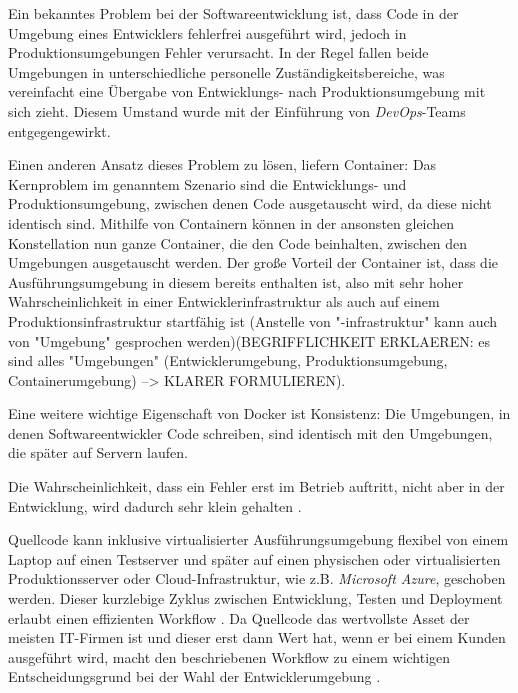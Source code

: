 \documentclass[../main.tex]{subfiles}
\begin{document}
    Ein bekanntes Problem bei der Softwareentwicklung ist, dass Code in der Umgebung eines Entwicklers fehlerfrei ausgeführt wird, jedoch in Produktionsumgebungen Fehler verursacht. In der Regel fallen beide Umgebungen in unterschiedliche personelle Zuständigkeitsbereiche, was vereinfacht eine Übergabe von Entwicklungs- nach Produktionsumgebung mit sich zieht. Diesem Umstand wurde mit der Einführung von \emph{\gls{DevOps}}-Teams entgegengewirkt.

    Einen anderen Ansatz dieses Problem zu lösen, liefern Container: Das Kernproblem im genanntem Szenario sind die Entwicklungs- und Produktionsumgebung, zwischen denen Code ausgetauscht wird, da diese nicht identisch sind. Mithilfe von Containern können in der ansonsten gleichen Konstellation nun ganze Container, die den Code beinhalten, zwischen den Umgebungen ausgetauscht werden. Der große Vorteil der Container ist, dass die Ausführungsumgebung in diesem bereits enthalten ist, also mit sehr hoher Wahrscheinlichkeit in einer Entwicklerinfrastruktur als auch auf einem Produktionsinfrastruktur startfähig ist (Anstelle von "-infrastruktur" kann auch von "Umgebung" gesprochen werden)(BEGRIFFLICHKEIT ERKLAEREN: es sind alles "Umgebungen" (Entwicklerumgebung, Produktionsumgebung, Containerumgebung) --> KLARER FORMULIEREN).

    Eine weitere wichtige Eigenschaft von Docker ist Konsistenz: Die Umgebungen, in denen Softwareentwickler Code schreiben, sind identisch mit den Umgebungen, die später auf Servern laufen.

    Die Wahrscheinlichkeit, dass ein Fehler erst im Betrieb auftritt, nicht aber in der Entwicklung, wird dadurch sehr klein gehalten \cite[S.8]{dockerBook}.

    Quellcode kann inklusive virtualisierter Ausführungsumgebung flexibel von einem Laptop auf einen Testserver und später auf einen physischen oder virtualisierten Produktionsserver oder \gls{Cloud}-Infrastruktur, wie z.B. \emph{Microsoft Azure}, geschoben werden. Dieser kurzlebige Zyklus zwischen Entwicklung, Testen und Deployment erlaubt einen effizienten Workflow \cite[S.8+12]{dockerBook}.
    Da Quellcode das wertvollste Asset der meisten \acrshort{IT}-Firmen ist und dieser erst dann Wert hat, wenn er bei einem Kunden ausgeführt wird, macht den beschriebenen Workflow zu einem wichtigen Entscheidungsgrund bei der Wahl der Entwicklerumgebung \cite[S.1]{dockerIntroIEEE}.
\end{document}
